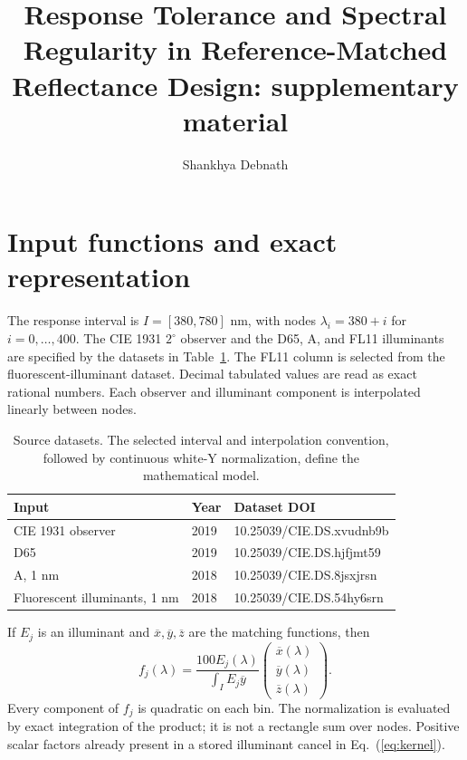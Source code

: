 \documentclass[9pt]{osa-supplemental-document}
\title{Response Tolerance and Spectral Regularity in Reference-Matched Reflectance Design: supplementary material}
\author{Shankhya Debnath}
\renewcommand{\eqref}[1]{\textup{(\ref{#1})}}
\begin{document}
\maketitle
\par\medskip
\section{Input functions and exact representation}
The response interval is $I=[380,780]$ nm, with nodes $\lambda_i=380+i$ for $i=0,\ldots,400$. The CIE 1931 $2^\circ$ observer and the D65, A, and FL11 illuminants are specified by the datasets in Table~\ref{tab:sources}. The FL11 column is selected from the fluorescent-illuminant dataset. Decimal tabulated values are read as exact rational numbers. Each observer and illuminant component is interpolated linearly between nodes.

\begin{table}[htbp]
\centering\small
\caption{Source datasets. The selected interval and interpolation convention, followed by continuous white-Y normalization, define the mathematical model.}
\label{tab:sources}
\begin{tabular}{lll}
\toprule
Input & Year & Dataset DOI\\
\midrule
CIE 1931 observer & 2019 & 10.25039/CIE.DS.xvudnb9b\\
D65 & 2019 & 10.25039/CIE.DS.hjfjmt59\\
A, 1 nm & 2018 & 10.25039/CIE.DS.8jsxjrsn\\
Fluorescent illuminants, 1 nm & 2018 & 10.25039/CIE.DS.54hy6srn\\
\bottomrule
\end{tabular}
\end{table}

If $E_j$ is an illuminant and $\overline x,\overline y,\overline z$ are the matching functions, then
\begin{equation}
 f_j(\lambda)=\frac{100E_j(\lambda)}{\int_I E_j\overline y}
 \begin{pmatrix}\overline x(\lambda)\\\overline y(\lambda)\\\overline z(\lambda)\end{pmatrix}.
 \label{eq:kernel}
\end{equation}
Every component of $f_j$ is quadratic on each bin. The normalization is evaluated by exact integration of the product; it is not a rectangle sum over nodes. Positive scalar factors already present in a stored illuminant cancel in Eq.~\eqref{eq:kernel}.
\end{document}
